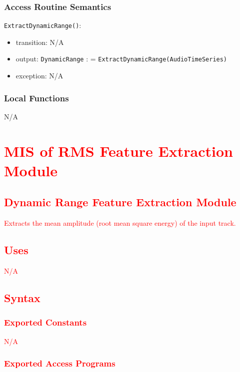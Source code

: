 \documentclass[12pt, titlepage]{article}
\begin{document}
\subsubsection{Access Routine Semantics}

\noindent \texttt{ExtractDynamicRange()}:
\begin{itemize}
\item transition: N/A
\item output: \texttt{Dynamic\textunderscore Range} : = \texttt{ExtractDynamicRange(Audio\textunderscore Time\textunderscore Series)}
\item exception: N/A
\end{itemize}

\subsubsection{Local Functions}
N/A

\section{\textcolor{red}{MIS of RMS Feature Extraction Module}} 

\subsection{\textcolor{red}{Dynamic Range Feature Extraction Module}}
\textcolor{red}{Extracts the mean amplitude (root mean square energy) of the input track.}

\subsection{\textcolor{red}{Uses}}
\textcolor{red}{N/A}

\subsection{\textcolor{red}{Syntax}}

\subsubsection{\textcolor{red}{Exported Constants}}
\textcolor{red}{N/A}

\subsubsection{\textcolor{red}{Exported Access Programs}}
\end{document}
